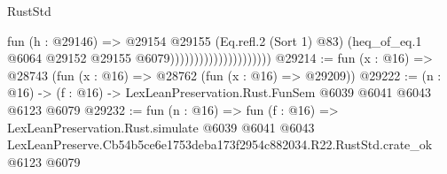 \begin{lexlean}{RustStd}
\begin{coremodule}
                                          fun (h : @29146) =>
                                          @29154
                                            @29155
                                            (Eq.refl.{2} (Sort 1) @83)
                                            (heq_of_eq.{1}
                                              @6064
                                              @29152
                                              @29155
                                              @6079)))))))))))))))))))))
@29214 := fun (x : @16) => @28743 (fun (x : @16) => @28762 (fun (x : @16) => @29209))
@29222 := (n : @16) -> (f : @16) -> LexLeanPreservation.Rust.FunSem @6039 @6041 @6043 @6123 @6079
@29232 := fun (n : @16) =>
  fun (f : @16) =>
  LexLeanPreservation.Rust.simulate
    @6039
    @6041
    @6043
    LexLeanPreserve.Cb54b5ce6e1753deba173f2954c882034.R22.RustStd.crate_ok
    @6123
    @6079
\end{coremodule}
\end{lexlean}
